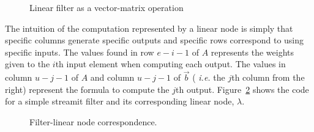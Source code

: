 \begin{figure}[t]
\vspace{-6pt}
\center
\epsfxsize=3.0in
\vspace{-12pt}
\caption{Linear filter as a vector-matrix operation}
\label{fig:overview-matrix}
\vspace{-6pt}
\end{figure}




The intuition of the computation represented by a linear node is
simply that specific columns generate specific outputs and specific
rows correspond to using specific inputs.  The values found in row
$e-i-1$ of $A$ represents the weights given to the $i$th
input element when computing each output.  The values in column
$u-j-1$ of $A$ and column $u-j-1$ of ${\vec b}$ ({\it
i.e.} the $j$th column from the right) represent the formula to
compute the $j$th output.
Figure~\ref{fig:linear-node-example} shows the code for a simple
streamit filter and its corresponding linear node, $\lambda$.

\begin{figure}
\center
\epsfxsize=2.0in
\vspace{-12pt}
\caption{Filter-linear node correspondence.}
\label{fig:linear-node-example}
\vspace{-12pt}
\end{figure}
